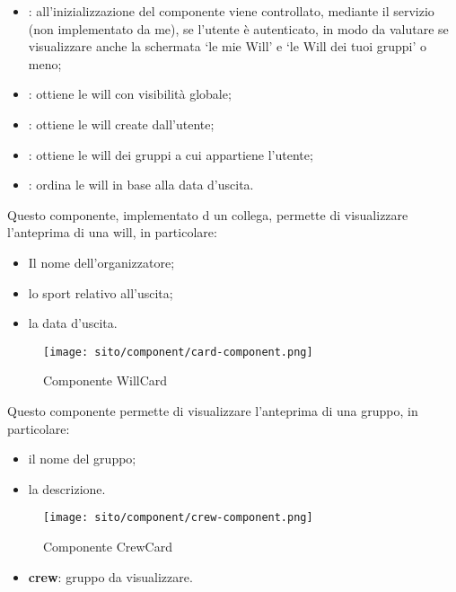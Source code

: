 \begin{itemize}
    \item {}: all'inizializzazione del componente viene controllato, mediante il servizio (non implementato da me), se l'utente è autenticato, in modo da valutare se visualizzare anche la schermata \enquote*{le mie Will} e \enquote*{le Will dei tuoi gruppi} o meno;
    \item {}: ottiene le \gls{will} con visibilità globale;
    \item {}: ottiene le \gls{will} create dall'utente;
    \item {}: ottiene le \gls{will} dei gruppi a cui appartiene l'utente;
    \item {}: ordina le \gls{will} in base alla data d'uscita. 
\end{itemize}


\label{par:WillCard}
Questo componente, implementato d un collega, permette di visualizzare l'anteprima di una \gls{will}, in particolare: 
\begin{itemize}
    \item Il nome dell'organizzatore;
    \item lo sport relativo all'uscita;
    \item la data d'uscita.
\end{itemize}

\begin{figure}[H] 
    \centering 
    \texttt{[image: sito/component/card-component.png]} 
    \caption{Componente WillCard}
\end{figure}

\label{par:CrewCard}
Questo componente permette di visualizzare l'anteprima di una gruppo, in particolare:  
\begin{itemize}
    \item il nome del gruppo;
    \item la descrizione.
\end{itemize}

\begin{figure}[H] 
    \centering 
    \texttt{[image: sito/component/crew-component.png]} 
    \caption{Componente CrewCard}
\end{figure}

\begin{itemize}
    \item \textbf{crew}: gruppo da visualizzare.
\end{itemize}

